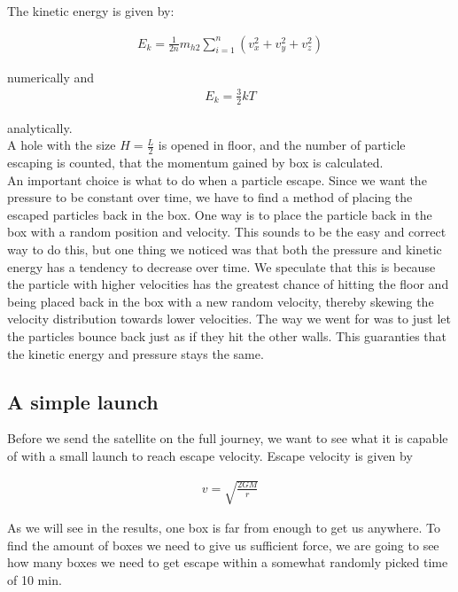 \documentclass[a4paper, 10pt]{article}
\begin{document}
The kinetic energy is given by:

\begin{align}
E_k = \frac{1}{2n}m_{h2}\sum\limits_{i=1}^{n}(v_x^{2} + v_y^{2} + v_z^{2})
\end{align}

numerically and
\begin{align}
 E_k = \frac{3}{2}kT
\end{align}

analytically. \\

A hole with the size $H =\frac{L}{2}$ is opened in floor, and the number of particle escaping is counted, that the momentum gained by box is calculated.\\

An important choice is what to do when a particle escape. Since we want the pressure to be constant over time, we have to find a method of placing the escaped particles back in the box. One way is to place the particle back in the box with a random position and velocity. This sounds to be the easy and correct way to do this, but one thing we noticed was that both the pressure and kinetic energy has a tendency to decrease over time. We speculate that this is because the particle with higher velocities has the greatest chance of hitting the floor and being placed back in the box with a new random velocity, thereby skewing the velocity distribution towards lower velocities. The way we went for was to just let the particles bounce back just as if they hit the other walls. This guaranties that the kinetic energy and pressure stays the same. 

\subsection{A simple launch}

Before we send the satellite on the full journey, we want to see what it is capable of with a small launch to reach escape velocity. Escape velocity is given by 

\begin{align}\label{eq:escape}
v = \sqrt{\frac{2GM}{r}}
\end{align}

As we will see in the results, one box is far from enough to get us anywhere. To find the amount of boxes we need to give us sufficient force, we are going to see how many boxes we need to get escape within a somewhat randomly picked time of 10 min.
\end{document}
